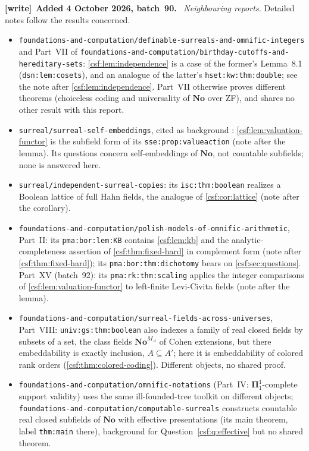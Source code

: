 \documentclass[11pt,a4paper]{article}
\numberwithin{equation}{section}
\theoremstyle{definition}
\theoremstyle{remark}
\newcommand{\No}{\mathbf{No}}
\newcommand{\repo}[1]{\nolinkurl{#1}}
\newcommand{\lbl}[1]{\nolinkurl{#1}}
\newenvironment{writenote}[1][]{\par\smallskip\begingroup\small\raggedright
 \setlength{\parindent}{1.25em}\noindent\textbf{[write]}\if\relax\detokenize{#1}\relax\else~\textbf{#1.}\fi\ }%
 {\par\endgroup\smallskip}
\begin{document}
\begin{writenote}[Added 4 October 2026, batch~90]
\emph{Neighbouring reports.} Detailed notes follow the results concerned.
\begin{itemize}[leftmargin=1.5em]
\item \repo{foundations-and-computation/definable-surreals-and-omnific-integers} and Part~VII of \repo{foundations-and-computation/birthday-cutoffs-and-hereditary-sets}: \cref{csf:lem:independence} is a case of the former's Lemma~8.1 (\lbl{dsn:lem:cosets}), and an analogue of the latter's \lbl{hset:kw:thm:double}; see the note after \cref{csf:lem:independence}. Part~VII otherwise proves different theorems (choiceless coding and universality of $\No$ over ZF), and shares no other result with this report.
\item \repo{surreal/surreal-self-embeddings}, cited as background \cite{sse}: \cref{csf:lem:valuation-functor} is the subfield form of its \lbl{sse:prop:valueaction} (note after the lemma). Its questions concern self-embeddings of $\No$, not countable subfields; none is answered here.
\item \repo{surreal/independent-surreal-copies}: its \lbl{isc:thm:boolean} realizes a Boolean lattice of full Hahn fields, the analogue of \cref{csf:cor:lattice} (note after the corollary).
\item \repo{foundations-and-computation/polish-models-of-omnific-arithmetic}, Part~II: its \lbl{pma:bor:lem:KB} contains \cref{csf:lem:kb} and the analytic-completeness assertion of \cref{csf:thm:fixed-hard} in complement form (note after \cref{csf:thm:fixed-hard}); its \lbl{pma:bor:thm:dichotomy} bears on \cref{csf:sec:questions}. Part~XV (batch~92): its \lbl{pma:rk:thm:scaling} applies the integer comparisons of \cref{csf:lem:valuation-functor} to left-finite Levi-Civita fields (note after the lemma).
\item \repo{foundations-and-computation/surreal-fields-across-universes}, Part~VIII: \lbl{univ:gs:thm:boolean} also indexes a family of real closed fields by subsets of a set, the class fields $\No^{M_A}$ of Cohen extensions, but there embeddability is exactly inclusion, $A\subseteq A'$; here it is embeddability of colored rank orders (\cref{csf:thm:colored-coding}). Different objects, no shared proof.
\item \repo{foundations-and-computation/omnific-notations} (Part~IV: $\boldsymbol\Pi^1_1$-complete support validity) uses the same ill-founded-tree toolkit on different objects; \repo{foundations-and-computation/computable-surreals} constructs countable real closed subfields of $\No$ with effective presentations (its main theorem, label \texttt{thm:main} there), background for Question~\ref{csf:q:effective} but no shared theorem.

\end{itemize}
\end{writenote}
\end{document}
